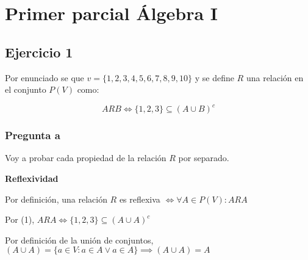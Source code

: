 
\usepackage{caratula}
\usepackage{enumerate}
\usepackage{hyperref}
\usepackage{graphicx}
\usepackage{amsfonts}
\usepackage{enumitem}
\usepackage{amsmath}

\decimalpoint
\hypersetup{colorlinks=true, linkcolor=black, urlcolor=blue}
\setlength{\parindent}{0em}
\setlength{\parskip}{0.5em}
\setcounter{tocdepth}{3} %
\setcounter{section}{0} %
\renewcommand{\thesubsubsection}{\thesubsection.\Alph{subsubsection}}
\graphicspath{ {images/} }





\maketitle
\newpage

\tableofcontents
\newpage

\section{Primer parcial Álgebra I}
\subsection{Ejercicio 1}

Por enunciado se que $ v = \{ 1,2,3,4,5,6,7,8,9,10 \} $ y se define $R$ una relación en el conjunto $ P(V) $ como:

\begin{equation}
    ARB \iff \{ 1,2,3 \} \subseteq (A\cup B)^c
\end{equation}

\subsubsection{Pregunta a}

Voy a probar cada propiedad de la relación $R$ por separado.

\textbf{Reflexividad}

Por definición, una relación $R$ es reflexiva $ \iff \forall A \in P(V): ARA $

Por (1), $ ARA \iff \{ 1,2,3 \} \subseteq (A\cup A)^c$

Por definición de la unión de conjuntos, $ (A\cup A) = \{ a \in V: a \in A \vee a \in A\} \implies (A\cup A) = A $

